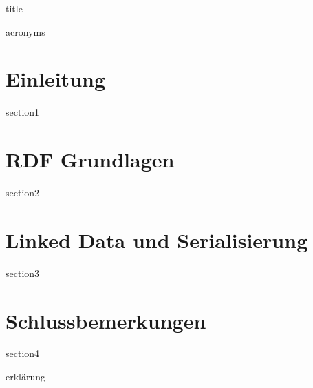 \documentclass[12pt,
               a4paper,
               twoside=false,
               titlepage=true,
               bibliography=totoc, %
               listof=totoc, %
               numbers=noenddot]{scrartcl}
\begin{document}
{title}

\setcounter{page}{2}
\newpage

\tableofcontents %
\newpage
\listoffigures %
\newpage
\listoftables %
\newpage
\lstlistoflistings
\newpage
\listofformels %
\newpage
{acronyms}
\newpage

\setcounter{page}{3}
\section{Einleitung}
\label{sec:einleitung}
{section1}

\section{RDF Grundlagen}
\label{sec:rdf-grundlagen}
{section2} 

\section{Linked Data und Serialisierung}
\label{sec:linked-data-serialisierung}
{section3}

\section{Schlussbemerkungen}
\label{sec:schlussbemerkungen}
{section4}
\newpage

\printbibliography[heading=bibintoc, title={Literaturverzeichnis}]	
\newpage
{erklärung} %
\end{document}
